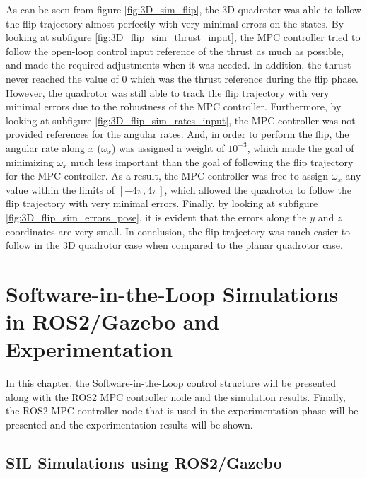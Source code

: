 \documentclass{thesisreport}
\begin{document}
\newpage

As can be seen from figure \ref{fig:3D_sim_flip}, the 3D quadrotor was able to follow the flip trajectory almost perfectly with very minimal errors on the states. By looking at subfigure \ref{fig:3D_flip_sim_thrust_input}, the MPC controller tried to follow the open-loop control input reference of the thrust as much as possible, and made the required adjustments when it was needed. In addition, the thrust never reached the value of 0 which was the thrust reference during the flip phase. However, the quadrotor was still able to track the flip trajectory with very minimal errors due to the robustness of the MPC controller. Furthermore, by looking at subfigure \ref{fig:3D_flip_sim_rates_input}, the MPC controller was not provided references for the angular rates. And, in order to perform the flip, the angular rate along $x$ ($\omega_x$) was assigned a weight of $10^{-3}$, which made the goal of minimizing $\omega_x$ much less important than the goal of following the flip trajectory for the MPC controller. As a result, the MPC controller was free to assign $\omega_x$ any value within the limits of $[-4 \pi, 4 \pi]$, which allowed the quadrotor to follow the flip trajectory with very minimal errors. Finally, by looking at subfigure \ref{fig:3D_flip_sim_errors_pose}, it is evident that the errors along the $y$ and $z$ coordinates are very small. In conclusion, the flip trajectory was much easier to follow in the 3D quadrotor case when compared to the planar quadrotor case. 
















  \chapter{Software-in-the-Loop Simulations in ROS2/Gazebo and Experimentation}
 	In this chapter, the Software-in-the-Loop control structure will be presented along with the ROS2 MPC controller node and the simulation results. Finally, the ROS2 MPC controller node  that is used in the  experimentation phase will be presented and the experimentation results will be shown.
	\section{SIL Simulations using ROS2/Gazebo}\label{sec:SIL_simulations}
\end{document}
